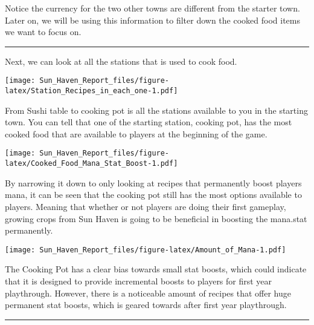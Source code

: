 \documentclass[
]{article}
\begin{document}
Notice the currency for the two other towns are different from the
starter town. Later on, we will be using this information to filter down
the cooked food items we want to focus on.

\begin{center}\rule{0.5\linewidth}{0.5pt}\end{center}

Next, we can look at all the stations that is used to cook food.

\texttt{[image: Sun\_Haven\_Report\_files/figure-latex/Station\_Recipes\_in\_each\_one-1.pdf]}

From Sushi table to cooking pot is all the stations available to you in
the starting town. You can tell that one of the starting station,
cooking pot, has the most cooked food that are available to players at
the beginning of the game.

\texttt{[image: Sun\_Haven\_Report\_files/figure-latex/Cooked\_Food\_Mana\_Stat\_Boost-1.pdf]}

By narrowing it down to only looking at recipes that permanently boost
players mana, it can be seen that the cooking pot still has the most
options available to players. Meaning that whether or not players are
doing their first gameplay, growing crops from Sun Haven is going to be
beneficial in boosting the mana.stat permanently.

\texttt{[image: Sun\_Haven\_Report\_files/figure-latex/Amount\_of\_Mana-1.pdf]}

The Cooking Pot has a clear bias towards small stat boosts, which could
indicate that it is designed to provide incremental boosts to players
for first year playthrough. However, there is a noticeable amount of
recipes that offer huge permanent stat boosts, which is geared towards
after first year playthrough.

\begin{center}\rule{0.5\linewidth}{0.5pt}\end{center}
\end{document}
